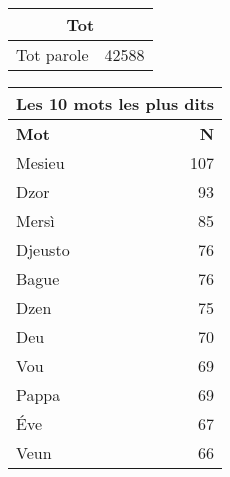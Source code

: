 
\begin{table}[]
\centering
\begin{tabular}{lr}
\multicolumn{2}{c}{Tot} \\
    \toprule
Tot parole & 42588 \\
\bottomrule
\end{tabular}%
\end{table}
\begin{table}[]
\centering
\begin{tabular}{lr}
\multicolumn{2}{c}{Les 10 mots les plus dits} \\
    \toprule
\multicolumn{1}{l}{\textbf{Mot}} & \textbf{N} \\
    \midrule
\multicolumn{1}{l}{Mesieu} &107\\
\multicolumn{1}{l}{Dzor} &93\\
\multicolumn{1}{l}{Mersì} &85\\
\multicolumn{1}{l}{Djeusto} &76\\
\multicolumn{1}{l}{Bague} &76\\
\multicolumn{1}{l}{Dzen} &75\\
\multicolumn{1}{l}{Deu} &70\\
\multicolumn{1}{l}{Vou} &69\\
\multicolumn{1}{l}{Pappa} &69\\
\multicolumn{1}{l}{Éve} &67\\
\multicolumn{1}{l}{Veun} &66\\
\bottomrule
\end{tabular}%
\end{table}
\newpage
\scriptsize
